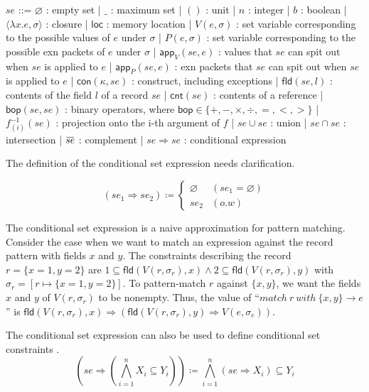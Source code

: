 \documentclass{article}
\newcommand{\loverbar}[1]{\mkern 1.5mu\overline{\mkern-1.5mu#1\mkern-1.5mu}\mkern 1.5mu}
\begin{document}
\begin{bnfgrammar}
  $se$ ::= $\varnothing$ : empty set
  | $\_$ : maximum set
  | $()$ : unit
  | $n$ : integer
  | $b$ : boolean
  | $\langle\lambda x.e,\sigma\rangle$ : closure
  | $\mathsf{loc}$ : memory location
  | $V(e,\sigma)$ : set variable corresponding to the possible values of $e$ under $\sigma$
  | $P(e,\sigma)$ : set variable corresponding to the possible exn packets of $e$ under $\sigma$
  | $\mathsf{app}_{V}(se,e)$ : values that $se$ can spit out when $se$ is applied to $e$
  | $\mathsf{app}_{P}(se,e)$ : exn packets that $se$ can spit out when $se$ is applied to $e$
  | $\mathsf{con}(\kappa,se)$ : construct, including exceptions
  | $\mathsf{fld}(se, l)$ : contents of the field $l$ of a record $se$
  | $\mathsf{cnt}(se)$ : contents of a reference
  | $\mathsf{bop}(se, se)$ : binary operators, where $\mathsf{bop}\in\{+, -, \times, \div, =, <, >\}$
  | $f^{-1}_{(i)}(se)$ : projection onto the i-th argument of $f$
  | $se \cup se$ : union
  | $se \cap se$ : intersection
  | $\loverbar{se}$ : complement
  | $se \Rightarrow se$ : conditional expression
\end{bnfgrammar}

The definition of the conditional set expression needs clarification.

\[
  (se_{1} \Rightarrow se_{2}) \coloneq
  \begin{cases}
    \varnothing & (se_{1}=\varnothing)\\
    se_{2} & (o.w)
  \end{cases}
\]

The conditional set expression is a naive approximation for pattern matching. Consider the case when we want to match an expression against the record pattern with fields $x$ and $y$.
The constraints describing the record $r = \{x = 1, y = 2\}$ are $1 \subseteq \mathsf{fld}(V(r,\sigma_{r}), x) \wedge 2 \subseteq \mathsf{fld}(V(r,\sigma_{r}), y)$ with $\sigma_{r}=[r\mapsto\{x=1, y=2\}]$.
To pattern-match $r$ against $\{x, y\}$, we want the fields $x$ and $y$ of $V(r,\sigma_{r})$ to be nonempty.
Thus, the value of ``$match\:r\:with\:\{x, y\}\rightarrow e$'' is $\mathsf{fld}(V(r,\sigma_{r}), x)\Rightarrow(\mathsf{fld}(V(r,\sigma_{r}),y)\Rightarrow V(e,\sigma_{e}))$.

The conditional set expression can also be used to define conditional set constraints \cite{Aik99}.
\[
  \left(se \Rightarrow \left(\bigwedge_{i=1}^{n}{X_{i}\subseteq Y_{i}}\right)\right) \coloneq \bigwedge_{i=1}^{n}{(se \Rightarrow X_{i}) \subseteq Y_{i}}
\]
\end{document}
